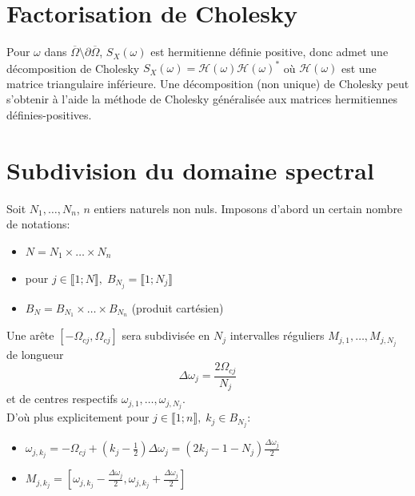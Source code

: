 
\section{Factorisation de Cholesky} 
\label{choleskyFactSection}
Pour $\omega$ dans $\overline{\Omega} \setminus \partial\overline{\Omega}$, $S_X(\omega)$ est hermitienne définie positive, donc admet une décomposition de Cholesky 
$S_X(\omega)=\mathcal{H}(\omega)\mathcal{H}(\omega)^{*}$ où $\mathcal{H}(\omega)$ est une matrice triangulaire inférieure. 
Une décomposition (non unique) de Cholesky peut s'obtenir à l'aide la méthode de Cholesky généralisée aux matrices hermitiennes définies-positives.

\section{Subdivision du domaine spectral}
\label{subdivdomspec}
Soit $N_1, \dots, N_n$, $n$ entiers naturels non nuls.
Imposons d'abord un certain nombre de notations:

\begin{itemize}
\item $N = N_1 \times \dots \times N_n$

\item pour $j \in \llbracket 1; N \rrbracket, \; B_{N_j} = \llbracket 1; N_j \rrbracket$

\item $B_N = B_{N_1} \times \dots \times B_{N_n}$ (produit cartésien)\\
\end{itemize}

Une arête $[-\Omega_{cj},\Omega_{cj}]$ sera subdivisée en $N_j$ intervalles réguliers $M_{j,1},\dots , M_{j,N_j}$ de longueur
\begin{equation}
 \Delta\omega_{j} = \frac{2\Omega_{cj}}{N_j}
\end{equation}
et de centres respectifs $\omega_{j,1}, \dots, \omega_{j,N_j}$.\\
\newpage
\noindent D'où plus explicitement pour $j \in \llbracket 1; n \rrbracket,\; k_j \in B_{N_j}$:
\begin{itemize}
\item $\omega_{j,k_j} = -\Omega_{cj} + (k_j - \frac{1}{2})\Delta\omega_{j} = (2k_j - 1 - N_j)\frac{\Delta\omega_{j}}{2}$ 

\item $M_{j,k_j} = [\omega_{j,k_j} - \frac{\Delta\omega_{j}}{2}, \omega_{j,k_j} + \frac{\Delta\omega_{j}}{2}]$\\
\end{itemize}

